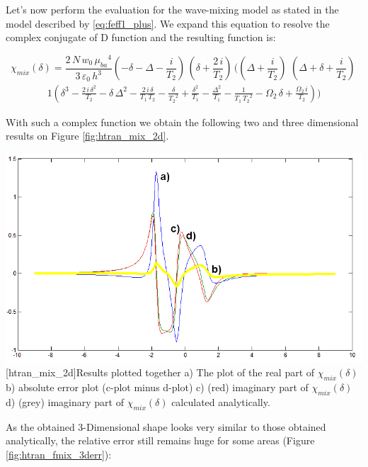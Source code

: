 \documentclass[12pt,twoside,a4paper]{article}
\numberwithin{equation}{subsection}
\numberwithin{figure}{subsection}
\begin{document}
Let's now perform the evaluation for the wave-mixing model as stated in the model described by \ref{eq:feff1_plus}. We expand this
equation to resolve the complex conjugate of D function and the resulting function is:

\begin{equation} \label{eq:htran_feffexp}
  {\chi_{mix}}(\delta ) = 
    \frac{2\,N\,{w_{0}}\,{\mu_{ba}}^{4}}{3\,\varepsilon_0\,h^{3}}( - \delta - \Delta - \frac {i}{{T_{2}}})\,(\delta +
    \frac{2\,i}{{T_{2}}})\,((\Delta + \frac {i}{{T_{2}}})\,\,(\Delta + \delta + \frac {i}{{T_{2}}})\,
\end{equation}
\begin{alignat*}{1}
  (\delta ^{3} - \frac
    {2\,i\,\delta ^{2}}{{T _{2}}} - \delta \,\Delta ^{2} - \frac {2\,i\,\delta }{{T_{1}}\,{T_{2}}} - \frac {\delta }{{T_{2}}^{2}} +
    \frac {\delta ^{2}}{{T_{1 }}} - \frac {\Delta ^{2}}{{T_{1}}} - \frac {1}{{T_{1}}\,{T_{2}}^{2}} - {\Omega_{2}}\,\delta  + \frac
    {{\Omega_{2}}\,i}{{T_{2}}}) )
\end{alignat*}

With such a complex function we obtain the following two and three dimensional results on Figure \ref{fig:htran_mix_2d}. 
\begin{center}
  \includegraphics[width=150mm]{img/htran_fmix_2d.png}
  [htran_mix_2d]{Results plotted together
   a) The plot of the real part of ${\chi_{mix}}(\delta )$
   b) absolute error plot (c-plot minus d-plot)
   c) (red) imaginary part of  ${\chi_{mix}}(\delta )$
   d) (grey) imaginary part of ${\chi_{mix}}(\delta )$ calculated analytically.
   \label{fig:htran_mix_2d} 
   }
\end{center}

As the obtained 3-Dimensional shape looks very similar to those obtained analytically, the relative error still remains huge for some
areas (Figure \ref{fig:htran_fmix_3derr}):
\end{document}
